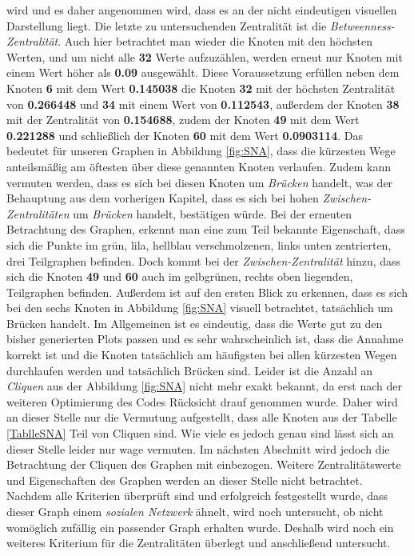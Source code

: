 wird und es daher angenommen wird, dass es an der nicht eindeutigen visuellen Darstellung liegt. Die letzte zu untersuchenden Zentralität ist die \textit{Betweenness-Zentralität}. Auch hier betrachtet man wieder die Knoten mit den höchsten Werten, und um nicht alle \textbf{32} Werte aufzuzählen, werden erneut nur Knoten mit einem Wert höher als \textbf{0.09} ausgewählt. Diese Voraussetzung erfüllen neben dem Knoten \textbf{6} mit dem Wert \textbf{0.145038} die Knoten \textbf{32} mit der höchsten Zentralität von \textbf{0.266448} und \textbf{34} mit einem Wert von \textbf{0.112543}, außerdem der Knoten \textbf{38} mit der Zentralität von \textbf{0.154688}, zudem der Knoten \textbf{49} mit dem Wert \textbf{0.221288} und schließlich der Knoten \textbf{60} mit dem Wert \textbf{0.0903114}. Das bedeutet für unseren Graphen in Abbildung \ref{fig:SNA}, dass die kürzesten Wege anteilsmäßig am öftesten über diese genannten Knoten verlaufen. Zudem kann vermuten werden, dass es sich bei diesen Knoten um \textit{Brücken} handelt, was der Behauptung aus dem vorherigen Kapitel, dass es sich bei hohen \textit{Zwischen-Zentralitäten} um \textit{Brücken} handelt, bestätigen würde. Bei der erneuten Betrachtung des Graphen, erkennt man eine zum Teil bekannte Eigenschaft, dass sich die Punkte im grün, lila, hellblau verschmolzenen, links unten zentrierten, drei Teilgraphen befinden. Doch kommt bei der \textit{Zwischen-Zentralität} hinzu, dass sich die Knoten \textbf{49} und \textbf{60} auch im gelbgrünen, rechts oben liegenden, Teilgraphen befinden. Außerdem ist auf den ersten Blick zu erkennen, dass es sich bei den sechs Knoten in Abbildung \ref{fig:SNA} visuell betrachtet, tatsächlich um Brücken handelt. Im Allgemeinen ist es eindeutig, dass die Werte gut zu den bisher generierten Plots passen und es sehr wahrscheinlich ist, dass die Annahme korrekt ist und die Knoten tatsächlich am häufigsten bei allen kürzesten Wegen durchlaufen werden und tatsächlich Brücken sind. Leider ist die Anzahl an \textit{Cliquen} aus der Abbildung \ref{fig:SNA} nicht mehr exakt bekannt, da erst nach der weiteren Optimierung des Codes Rücksicht drauf genommen wurde. Daher wird an dieser Stelle nur die Vermutung aufgestellt, dass alle Knoten aus der Tabelle \ref{TablleSNA} Teil von Cliquen sind. Wie viele es jedoch genau sind lässt sich an dieser Stelle leider nur wage vermuten. Im nächsten Abschnitt wird jedoch die Betrachtung der Cliquen des Graphen mit einbezogen. Weitere Zentralitätswerte und Eigenschaften des Graphen werden an dieser Stelle nicht betrachtet. Nachdem alle Kriterien überprüft sind und erfolgreich festgestellt wurde, dass dieser Graph einem \textit{sozialen Netzwerk} ähnelt, wird noch untersucht, ob nicht womöglich zufällig ein passender Graph erhalten wurde. Deshalb wird noch ein weiteres Kriterium für die Zentralitäten überlegt und anschließend untersucht.


